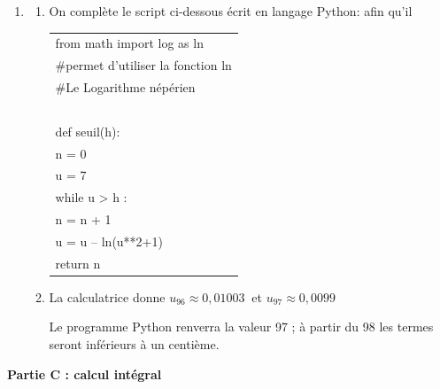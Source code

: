 \documentclass[10pt]{article}
\providecommand{\red}{\color{red}}
\providecommand{\np}[2][]{{#2~#1}}
\providecommand{\red}{\color{red}}
\begin{document}
\begin{enumerate}
$\ell = \ell - \ln \left(\ell^2 + 1\right) \iff \ln \left(\ell^2 + 1\right) = 0  \iff \ell^2 + 1 = 1\iff \ell^2 = 0 \iff \ell = 0$

\item
	\begin{enumerate}
		\item On complète le script ci-dessous écrit en langage Python: afin qu'il


\begin{center}
\begin{tabular}{|l|}\hline
from math import log as ln\\
\#permet d'utiliser la fonction ln \\
\#Le Logarithme népérien\\
~\\
def seuil(h):\\
\quad n = 0\\
\quad u = 7\\
\quad while {\red u > h} :\\
\qquad n = n + 1\\
\qquad u = {\red u -- ln(u**2+1)}\\
\quad return n\\ \hline
\end{tabular}
\end{center}

		\item 
		La calculatrice donne $u_{96} \approx \np{0,01003}$ et $u_{97} \approx \np{0,0099}$
		
Le programme Python renverra la valeur 97 ; à partir du 98 les termes seront inférieurs à un centième.
		\end{enumerate}
\end{enumerate}

\begin{center}\textbf{Partie C : calcul intégral}\end{center}
\end{document}
